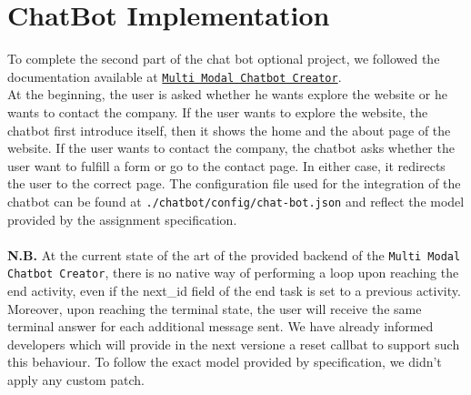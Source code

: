 \documentclass[12pt]{report}
\begin{document}
\chapter{ChatBot Implementation} 
To complete the second part of the chat bot optional project, we followed the documentation available at \href{https://gitlab.com/i3lab/mmcc/frontend/mmcc-vue/-/blob/master/README.md}{\texttt{Multi Modal Chatbot Creator}}.
\\At the beginning, the user is asked whether he wants explore the website or he wants to contact the company.
If the user wants to explore the website, the chatbot first introduce itself, then it shows the home and the about page of the website.
If the user wants to contact the company, the chatbot asks whether the user want to fulfill a form or go to the contact page.
In either case, it redirects the user to the correct page. The configuration file used for the integration of the chatbot can be found at \texttt{./chatbot/config/chat-bot.json} and reflect the model provided by the assignment specification.\\\\
\textbf{N.B.} At the current state of the art of the provided backend of the \texttt{Multi Modal Chatbot Creator}, there is no native way of performing a loop upon reaching the end activity, even if the next\_id field of the 
end task is set to a previous activity. Moreover, upon reaching the terminal state, the user will receive the same terminal answer for each additional message sent. We have already informed developers which 
will provide in the next versione a reset callbat to support such this behaviour. To follow the exact model provided by specification, we didn't apply any custom patch.
\end{document}
